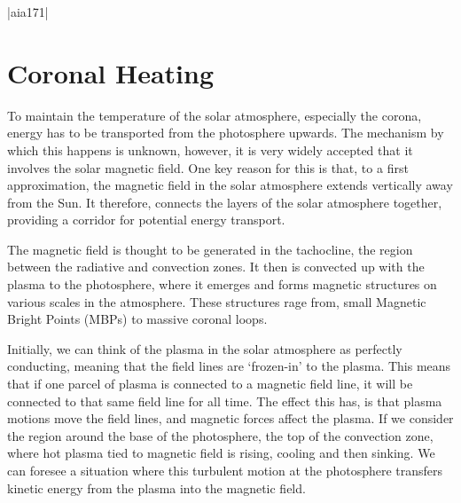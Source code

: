 \py[chapter1]|aia171|


\section{Coronal Heating}

To maintain the temperature of the solar atmosphere, especially the corona, energy has to be transported from the photosphere upwards.
The mechanism by which this happens is unknown, however, it is very widely accepted that it involves the solar magnetic field.
One key reason for this is that, to a first approximation, the magnetic field in the solar atmosphere extends vertically away from the Sun.
It therefore, connects the layers of the solar atmosphere together, providing a corridor for potential energy transport.

The magnetic field is thought to be generated in the tachocline, the region between the radiative and convection zones.
It then is convected up with the plasma to the photosphere, where it emerges and forms magnetic structures on various scales in the atmosphere.
These structures rage from, small Magnetic Bright Points (MBPs) to massive coronal loops.

Initially, we can think of the plasma in the solar atmosphere as perfectly conducting, meaning that the field lines are `frozen-in' to the plasma.
This means that if one parcel of plasma is connected to a magnetic field line, it will be connected to that same field line for all time.
The effect this has, is that plasma motions move the field lines, and magnetic forces affect the plasma.
If we consider the region around the base of the photosphere, the top of the convection zone, where hot plasma tied to magnetic field is rising, cooling and then sinking.
We can foresee a situation where this turbulent motion at the photosphere transfers kinetic energy from the plasma into the magnetic field.


